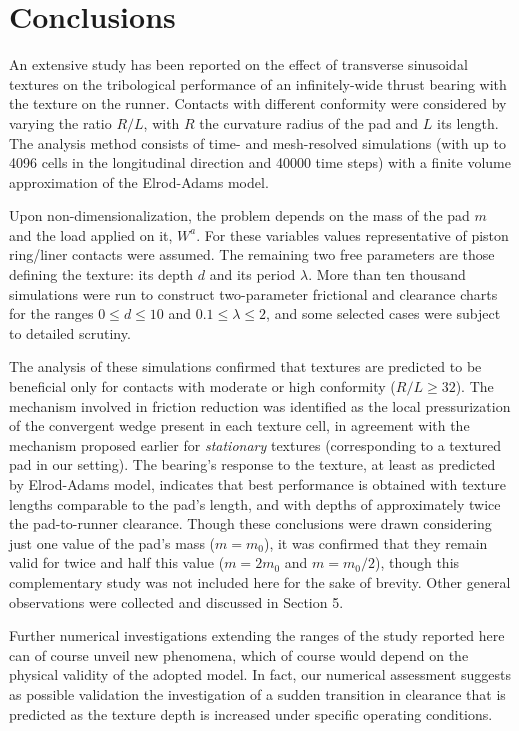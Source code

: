 \section{Conclusions}

An extensive study has been reported on the effect of transverse
sinusoidal textures on the tribological performance of an
infinitely-wide thrust bearing with the texture on the runner. 
Contacts with different conformity were considered by varying
the ratio $R/L$, with $R$ the curvature radius of the pad and
$L$ its length. The analysis method consists of time- and mesh-resolved
simulations (with up to 4096 cells in the longitudinal direction
and 40000 time steps) with a finite volume approximation of the
Elrod-Adams model. 

Upon non-dimensionalization, the problem depends
on the mass of the pad $m$ and the load applied on it, $W^a$. For these
variables values representative of piston ring/liner contacts were
assumed. The remaining two free parameters are those defining the
texture: its depth $d$ and its period $\lambda$. More than ten thousand
simulations were run to construct two-parameter frictional and
clearance charts for the ranges $0\leq d\leq 10$ and $0.1\leq \lambda\leq 2$,
and some selected cases were subject to detailed scrutiny.

The analysis of these simulations confirmed that textures are predicted to be
beneficial only for contacts with moderate or high conformity ($R/L \geq 32$).
The mechanism involved in friction reduction was identified
as the local pressurization of the convergent wedge present in each
texture cell, in agreement with the mechanism proposed earlier 
for {\em stationary} textures \cite{ets05,dobrica2010} (corresponding 
to a textured pad in our setting). The bearing's response to the texture, 
at least as predicted by Elrod-Adams model, indicates that best
performance is obtained with
texture lengths comparable to the pad's length, and with depths
of approximately twice the pad-to-runner clearance. Though these conclusions
were drawn considering just one value of the pad's mass ($m=m_0$), it was
confirmed that they remain valid for twice and half this value ($m=2m_0$ and $m=m_0/2$),
though this complementary study was not included here for the sake of brevity.
Other general observations were collected and discussed in Section 5. 

Further numerical investigations extending the ranges of the
study reported here can of course unveil new phenomena, which of course
would depend on the physical validity of the adopted model. In fact, our
numerical assessment suggests as possible validation 
the investigation of
a sudden transition in clearance that is predicted as the texture depth
is increased under specific operating conditions.




